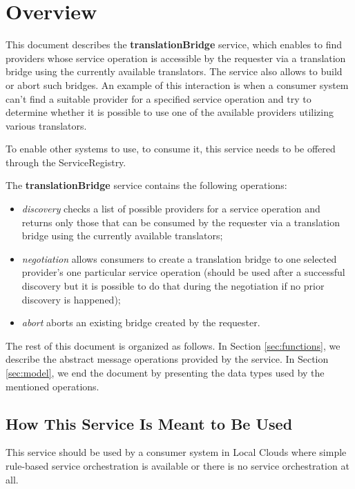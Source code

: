 \documentclass[a4paper]{arrowhead}
\begin{document}
\section{Overview}
\label{sec:overview}
This document describes the \textbf{translationBridge} service, which enables to find providers whose service operation is accessible by the requester via a translation bridge using the currently available translators. The service also allows to build or abort such bridges. An example of this interaction is when a consumer system can't find a suitable provider for a specified service operation and try to determine whether it is possible to use one of the available providers utilizing various translators.

To enable other systems to use, to consume it, this service needs to be offered through the ServiceRegistry.

The \textbf{translationBridge} service contains the following operations:

\begin{itemize}
    \item \textit{discovery} checks a list of possible providers for a service operation and returns only those that can be consumed by the requester via a translation bridge using the currently available translators;
    \item \textit{negotiation} allows consumers to create a translation bridge to one selected provider's one particular service operation (should be used after a successful discovery but it is possible to do that during the negotiation if no prior discovery is happened);
    \item \textit{abort} aborts an existing bridge created by the requester.
\end{itemize}

The rest of this document is organized as follows.
In Section \ref{sec:functions}, we describe the abstract message operations provided by the service.
In Section \ref{sec:model}, we end the document by presenting the data types used by the mentioned operations.

\subsection{How This Service Is Meant to Be Used}

This service should be used by a consumer system in Local Clouds where simple rule-based service orchestration is available or there is no service orchestration at all.
\end{document}
